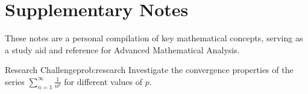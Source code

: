 \documentclass[12pt,a4paper]{article}
\begin{document}
\begin{figure}[h]
    \centering
\end{figure}

\section{Supplementary Notes}

\begin{note}
    These notes are a personal compilation of key mathematical concepts, serving as a study aid and reference for Advanced Mathematical Analysis.
\end{note}

\begin{Problem}{Research Challenge}{prob:research}
    Investigate the convergence properties of the series $\sum_{n=1}^{\infty} \frac{1}{n^p}$ for different values of $p$.
\end{Problem}
\end{document}
